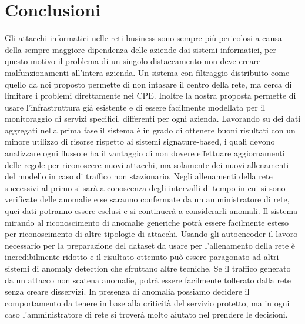 \chapter{Conclusioni}

Gli attacchi informatici nelle reti business sono sempre più pericolosi a causa della sempre maggiore dipendenza delle aziende dai sistemi informatici, per questo motivo il problema di un singolo distaccamento non deve creare malfunzionamenti all'intera azienda.
Un sistema con filtraggio distribuito come quello da noi proposto permette di non intasare il centro della rete, ma cerca di limitare i problemi direttamente nei CPE.
Inoltre la nostra proposta permette di usare l'infrastruttura già esistente e di essere facilmente modellata per il monitoraggio di servizi specifici, differenti per ogni azienda.
Lavorando su dei dati aggregati nella prima fase il sistema è in grado di ottenere buoni risultati con un minore utilizzo di risorse rispetto ai sistemi signature-based, i quali devono analizzare ogni flusso e ha il vantaggio di non dovere effettuare aggiornamenti delle regole per riconoscere nuovi attacchi, ma solamente dei nuovi allenamenti del modello in caso di traffico non stazionario. Negli allenamenti della rete successivi al primo si sarà a conoscenza degli intervalli di tempo in cui si sono verificate delle anomalie e se saranno confermate da un amministratore di rete, quei dati potranno essere esclusi e si continuerà a considerarli anomali.
Il sistema mirando al riconoscimento di anomalie generiche potrà essere facilmente esteso per riconoscimento di altre tipologie di attacchi.
Usando gli autoencoder il lavoro necessario per la preparazione del dataset da usare per l'allenamento della rete è incredibilmente ridotto e il risultato ottenuto può essere paragonato ad altri sistemi di anomaly detection che sfruttano altre tecniche.
Se il traffico generato da un attacco non scatena anomalie, potrà essere facilmente tollerato dalla rete senza creare disservizi.
In presenza di anomalia possiamo decidere il comportamento da tenere in base alla criticità del servizio protetto, ma in ogni caso l'amministratore di rete si troverà molto aiutato nel prendere le decisioni.

